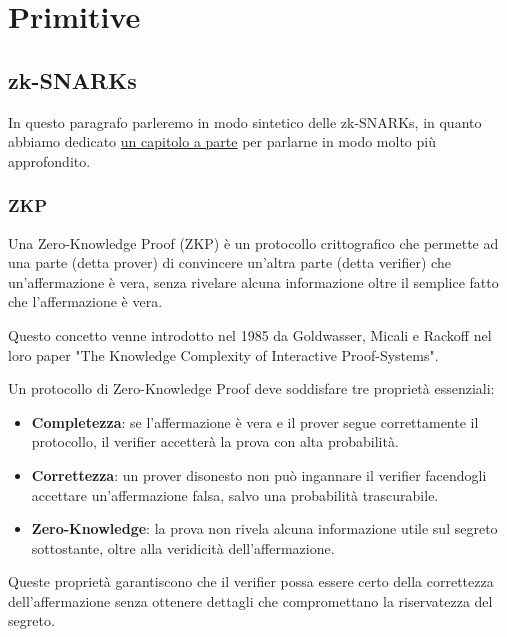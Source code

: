\chapter{Primitive}

\section{zk-SNARKs}

In questo paragrafo parleremo in modo sintetico delle zk-SNARKs, in quanto abbiamo dedicato \hyperref[cap:zk-snarks]{un capitolo a parte} per parlarne in modo molto più approfondito.

\subsection{ZKP}

Una Zero-Knowledge Proof (ZKP) è un protocollo crittografico che permette ad una parte (detta prover) di convincere un'altra parte (detta verifier) che un'affermazione è vera, senza rivelare alcuna informazione oltre il semplice fatto che l'affermazione è vera.


Questo concetto venne introdotto nel 1985 da Goldwasser, Micali e Rackoff nel loro paper "The Knowledge Complexity of Interactive Proof-Systems"\cite{goldwasser1989knowledge}.

Un protocollo di Zero-Knowledge Proof deve soddisfare tre proprietà essenziali:

\begin{itemize}
    \item \textbf{Completezza}: se l’affermazione è vera e il prover segue correttamente il protocollo, il verifier accetterà la prova con alta probabilità.
    \item \textbf{Correttezza}: un prover disonesto non può ingannare il verifier facendogli accettare un’affermazione falsa, salvo una probabilità trascurabile.
    \item \textbf{Zero-Knowledge}: la prova non rivela alcuna informazione utile sul segreto sottostante, oltre alla veridicità dell’affermazione.
\end{itemize}

Queste proprietà garantiscono che il verifier possa essere certo della correttezza dell’affermazione senza ottenere dettagli che compromettano la riservatezza del segreto. \\

